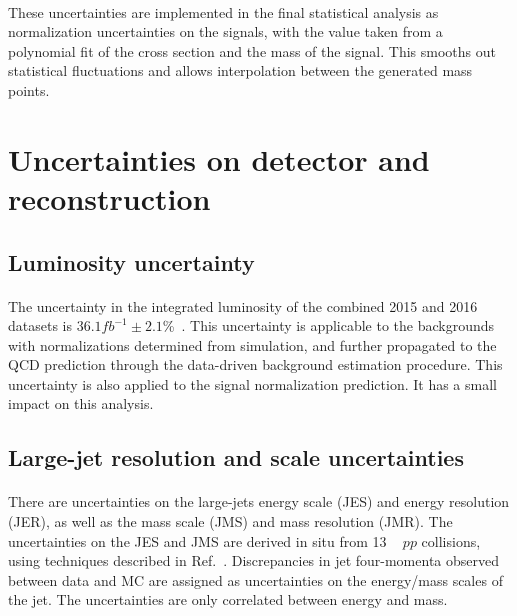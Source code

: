\paragraph{}
These uncertainties are implemented in the final statistical analysis as normalization uncertainties on the signals, with the value taken from a polynomial fit of the cross section and the mass of the signal.
This smooths out statistical fluctuations and allows interpolation between the generated mass points.


\section{Uncertainties on detector and reconstruction}

\subsection{Luminosity uncertainty} 
\paragraph{}
The uncertainty in the integrated luminosity of the combined 2015 and 2016 datasets is $36.1 fb^{-1}\pm2.1$\%~\cite{LumiCiteUP}.
This uncertainty is applicable to the backgrounds with normalizations determined from simulation, and further propagated to the QCD prediction through the data-driven background estimation procedure.
This uncertainty is also applied to the signal normalization prediction.
It has a small impact on this analysis. 

\subsection{Large-\R jet resolution and scale uncertainties} 
\paragraph{}
There are uncertainties on the large-\R jets energy scale (JES) and energy resolution (JER), as well as the mass scale (JMS) and mass resolution (JMR).
The uncertainties on the JES and JMS are derived in situ from 13 \TeV~ $pp$ collisions, using techniques described in Ref.~\cite{JetMassAndSubstructure}. 
Discrepancies in jet four-momenta observed between data and MC are assigned as uncertainties on the energy/mass scales of the jet.
The uncertainties are only correlated between energy and mass.

